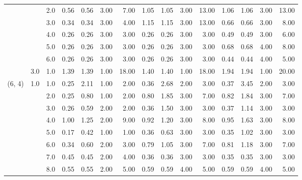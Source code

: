 \begin{tabular}{lllrrrrrrrrrrrr}
       &     & 2.0  &       0.56 &      0.56 & 3.00 &   7.00 &       1.05 &      1.05 &  3.00 &  13.00 &       1.06 &      1.06 &  3.00 &  13.00 \\
       &     & 3.0  &       0.34 &      0.34 & 3.00 &   4.00 &       1.15 &      1.15 &  3.00 &  13.00 &       0.66 &      0.66 &  3.00 &   8.00 \\
       &     & 4.0  &       0.26 &      0.26 & 3.00 &   3.00 &       0.26 &      0.26 &  3.00 &   3.00 &       0.49 &      0.49 &  3.00 &   6.00 \\
       &     & 5.0  &       0.26 &      0.26 & 3.00 &   3.00 &       0.26 &      0.26 &  3.00 &   3.00 &       0.68 &      0.68 &  4.00 &   8.00 \\
       &     & 6.0  &       0.26 &      0.26 & 3.00 &   3.00 &       0.26 &      0.26 &  3.00 &   3.00 &       0.44 &      0.44 &  4.00 &   5.00 \\
       & 3.0 & 1.0  &       1.39 &      1.39 & 1.00 &  18.00 &       1.40 &      1.40 &  1.00 &  18.00 &       1.94 &      1.94 &  1.00 &  20.00 \\
(6, 4) & 1.0 & 1.0  &       0.25 &      2.11 & 1.00 &   2.00 &       0.36 &      2.68 &  2.00 &   3.00 &       0.37 &      3.45 &  2.00 &   3.00 \\
       &     & 2.0  &       0.25 &      0.80 & 1.00 &   2.00 &       0.80 &      1.85 &  3.00 &   7.00 &       0.82 &      1.84 &  3.00 &   7.00 \\
       &     & 3.0  &       0.26 &      0.59 & 2.00 &   2.00 &       0.36 &      1.50 &  3.00 &   3.00 &       0.37 &      1.14 &  3.00 &   3.00 \\
       &     & 4.0  &       1.00 &      1.25 & 2.00 &   9.00 &       0.92 &      1.20 &  3.00 &   8.00 &       0.95 &      1.63 &  3.00 &   8.00 \\
       &     & 5.0  &       0.17 &      0.42 & 1.00 &   1.00 &       0.36 &      0.63 &  3.00 &   3.00 &       0.35 &      1.02 &  3.00 &   3.00 \\
       &     & 6.0  &       0.34 &      0.60 & 2.00 &   3.00 &       0.79 &      1.05 &  3.00 &   7.00 &       0.81 &      1.18 &  3.00 &   7.00 \\
       &     & 7.0  &       0.45 &      0.45 & 2.00 &   4.00 &       0.36 &      0.36 &  3.00 &   3.00 &       0.35 &      0.35 &  3.00 &   3.00 \\
       &     & 8.0  &       0.55 &      0.55 & 2.00 &   5.00 &       0.59 &      0.59 &  4.00 &   5.00 &       0.59 &      0.59 &  4.00 &   5.00 \\

\end{tabular}
